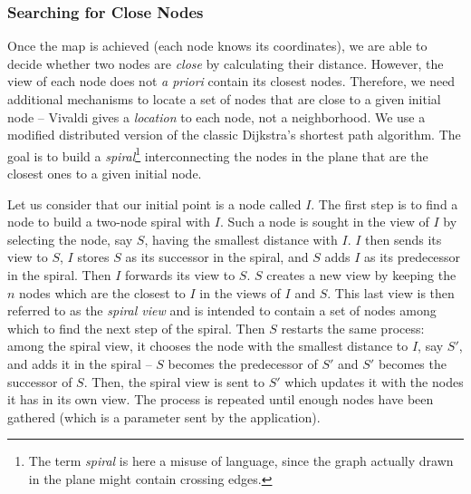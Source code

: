 
\subsubsection*{Searching for Close Nodes}

Once the map is achieved (each node knows its coordinates), we are able to
decide whether two nodes are \emph{close} by calculating their
distance. However, the view of each node does not \emph{a priori} contain its
closest nodes. Therefore, we need additional mechanisms to locate a set of nodes
that are close to a given initial node -- Vivaldi gives a \emph{location} to
each node, not a neighborhood. We use a modified distributed version of the
classic Dijkstra's shortest path algorithm. The goal is to build a
\emph{spiral}\footnote{The term \emph{spiral} is here a misuse of language,
since the graph actually drawn in the plane might contain crossing edges.}
interconnecting the nodes in the plane that are the closest ones to a given
initial node.

Let us consider that our initial point is a node called $I$. The first step is
to find a node to build a two-node spiral with $I$. Such a node is sought in the
view of $I$ by selecting the node, say $S$, having the smallest distance with
$I$. $I$ then sends its view to $S$, $I$ stores $S$ as its successor in the
spiral, and $S$ adds $I$ as its predecessor in the spiral. Then $I$ forwards its
view to $S$. $S$ creates a new view by keeping the $n$ nodes which are the
closest to $I$ in the views of $I$ and $S$. This last view is then referred to
as the \emph{spiral view} and is intended to contain a set of nodes among which
to find the next step of the spiral. Then $S$ restarts the same process: among
the spiral view, it chooses the node with the smallest distance to $I$, say
$S'$, and adds it in the spiral -- $S$ becomes the predecessor of $S'$ and $S'$
becomes the successor of $S$. Then, the spiral view is sent to $S'$ which
updates it with the nodes it has in its own view. The process is repeated until
enough nodes have been gathered (which is a parameter sent by the application).

